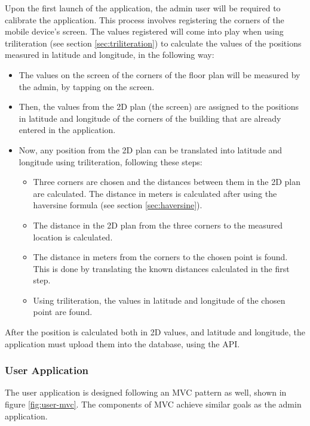 Upon the first launch of the application, the admin user will be required to calibrate the application. This process involves registering the corners of the mobile device's screen. The values registered will come into play when using triliteration (see section \ref{sec:triliteration}) to calculate the values of the positions measured in latitude and longitude, in the following way:

\begin{itemize}
    \item The values on the screen of the corners of the floor plan will be measured by the admin, by tapping on the screen.
    \item Then, the values from the 2D plan (the screen) are assigned to the positions in latitude and longitude of the corners of the building that are already entered in the application.
    \item Now, any position from the 2D plan can be translated into latitude and longitude using triliteration, following these steps:
    \begin{itemize}
        \item Three corners are chosen and the distances between them in the 2D plan are calculated. The distance in meters is calculated after using the haversine formula (see section \ref{sec:haversine}).
        \item The distance in the 2D plan from the three corners to the measured location is calculated.
        \item The distance in meters from the corners to the chosen point is found. This is done by translating the known distances calculated in the first step.
        \item Using triliteration, the values in latitude and longitude of the chosen point are found.
    \end{itemize}
\end{itemize}

After the position is calculated both in 2D values, and latitude and longitude, the application must upload them into the database, using the API.

\subsubsection{User Application}
The user application is designed following an MVC pattern as well, shown in figure \ref{fig:user-mvc}. The components of MVC achieve similar goals as the admin application. 

